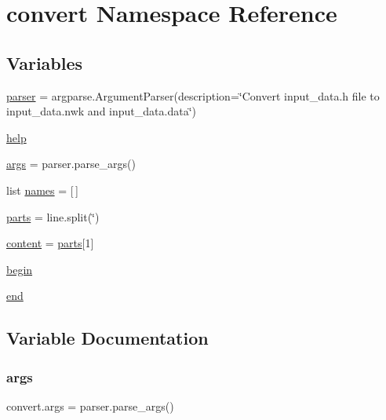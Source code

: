 \hypertarget{namespaceconvert}{}\section{convert Namespace Reference}
\label{namespaceconvert}
\subsection*{Variables}
\begin{DoxyCompactItemize}
\item 
\hyperlink{namespaceconvert_af8535903aa99b7698550743368e65b24}{parser} = argparse.\+Argument\+Parser(description=\char`\"{}Convert input\+\_\+data.\+h file to input\+\_\+data.\+nwk and input\+\_\+data.\+data\char`\"{})
\item 
\hyperlink{namespaceconvert_ab8cebf608a2f65563b42a9e36d15faea}{help}
\item 
\hyperlink{namespaceconvert_addfed92e768ff6351d23635234c6421f}{args} = parser.\+parse\+\_\+args()
\item 
list \hyperlink{namespaceconvert_ad822cbc3a6f3edbe9992f38b5c089549}{names} = \mbox{[}$\,$\mbox{]}
\item 
\hyperlink{namespaceconvert_a503fc94db74d6869d7c38721a1f90657}{parts} = line.\+split(\textquotesingle{}\char`\"{}\textquotesingle{})
\item 
\hyperlink{namespaceconvert_a86274e201865c2563ac99453b4942754}{content} = \hyperlink{namespaceconvert_a503fc94db74d6869d7c38721a1f90657}{parts}\mbox{[}1\mbox{]}
\item 
\hyperlink{namespaceconvert_a7178e39504bb511cac59b57fd16d1bbd}{begin}
\item 
\hyperlink{namespaceconvert_ac9289d9fbad9c51e7b759f61b260b248}{end}
\end{DoxyCompactItemize}


\subsection{Variable Documentation}
\mbox{\label{namespaceconvert_addfed92e768ff6351d23635234c6421f}} 
\subsubsection{\texorpdfstring{args}{args}}
{\footnotesize\ttfamily convert.\+args = parser.\+parse\+\_\+args()}

